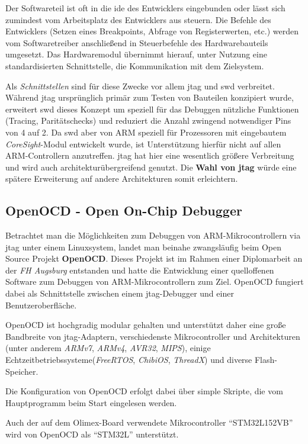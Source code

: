 Der Softwareteil ist oft in die \gls{ide} des Entwicklers eingebunden oder lässt
sich zumindest vom Arbeitsplatz des Entwicklers aus steuern. Die Befehle des
Entwicklers (Setzen eines Breakpoints, Abfrage von Registerwerten, etc.) werden
vom Softwaretreiber anschließend in Steuerbefehle des Hardwarebauteils
umgesetzt. Das Hardwaremodul übernimmt hierauf, unter Nutzung eine
standardisierten Schnittstelle, die Kommunikation mit dem Zielsystem.

Als \emph{Schnittstellen} sind für diese Zwecke vor allem \gls{jtag} und
\gls{swd} verbreitet. Während \gls{jtag} ursprünglich primär zum Testen von Bauteilen
konzipiert wurde, erweitert \gls{swd} dieses Konzept um speziell für das
Debuggen nützliche Funktionen (Tracing, Paritätschecks) und reduziert die Anzahl
zwingend notwendiger Pins von 4 auf 2. Da \gls{swd} aber von
ARM speziell für Prozessoren mit eingebautem \emph{CoreSight}-Modul entwickelt
wurde, ist Unterstützung hierfür nicht auf allen ARM-Controllern anzutreffen. \gls{jtag}
hat hier eine wesentlich größere Verbreitung und wird auch
architekturübergreifend genutzt. Die \textbf{Wahl von \gls{jtag}} würde eine
spätere Erweiterung auf andere Architekturen somit erleichtern.
\subsection{OpenOCD - Open On-Chip Debugger}
Betrachtet man die Möglichkeiten zum Debuggen von ARM-Mikrocontrollern via
\gls{jtag} unter einem Linuxsystem, landet man beinahe zwangsläufig beim Open
Source Projekt \textbf{OpenOCD}. Dieses Projekt ist im Rahmen einer
Diplomarbeit\cite{OOCD2} an der \emph{FH Augsburg} entstanden und hatte die
Entwicklung einer quelloffenen Software zum Debuggen von ARM-Mikrocontrollern zum Ziel.
OpenOCD fungiert dabei als Schnittstelle zwischen einem \gls{jtag}-Debugger und
einer Benutzeroberfläche.

OpenOCD ist hochgradig modular gehalten und unterstützt daher eine große
Bandbreite von \gls{jtag}-Adaptern, verschiedenste Mikrocontroller und
Architekturen (unter anderem \emph{ARMv7}, \emph{ARMv4}, \emph{AVR32},
\emph{MIPS}), einige Echtzeitbetriebssysteme(\emph{FreeRTOS}, \emph{ChibiOS},
\emph{ThreadX}) und diverse Flash-Speicher.

Die Konfiguration von OpenOCD erfolgt dabei über simple Skripte, die vom
Hauptprogramm beim Start eingelesen werden.

Auch der auf dem Olimex-Board verwendete Mikrocontroller "`STM32L152VB"' wird
von OpenOCD als "`STM32L"' unterstützt.

